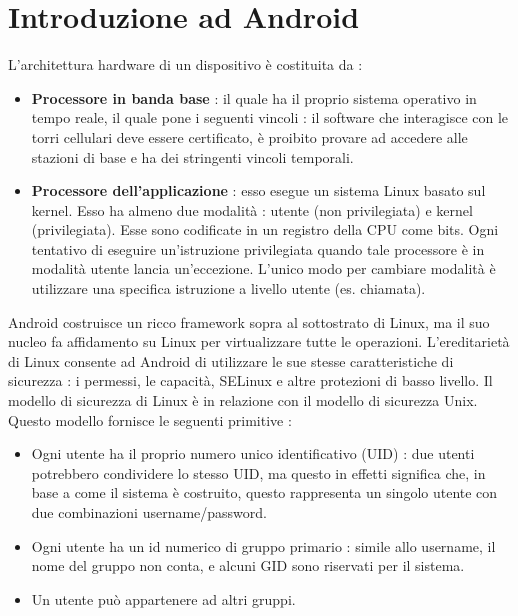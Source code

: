 \documentclass[12pt]{report}
\begin{document}
\chapter{Introduzione ad Android}
L'architettura hardware di un dispositivo è costituita da :
\begin{itemize}
\item \textbf{Processore in banda base} : il quale ha il proprio sistema operativo in tempo reale, il quale pone i seguenti vincoli : il software che interagisce con le torri cellulari deve essere certificato, è proibito provare ad accedere alle stazioni di base e ha dei stringenti vincoli temporali.
\item \textbf{Processore dell'applicazione} : esso esegue un sistema Linux basato sul kernel. Esso ha almeno due modalità : utente (non privilegiata) e kernel (privilegiata). Esse sono codificate in un registro della CPU come bits. Ogni tentativo di eseguire un'istruzione privilegiata quando tale processore è in modalità utente lancia un'eccezione. L'unico modo per cambiare modalità è utilizzare una specifica istruzione a livello utente (es. chiamata). 
\end{itemize}
Android costruisce un ricco framework sopra al sottostrato di Linux, ma il suo nucleo fa affidamento su Linux per virtualizzare tutte le operazioni. L'ereditarietà di Linux consente ad Android di utilizzare le sue stesse caratteristiche di sicurezza : i permessi, le capacità, SELinux e altre protezioni di basso livello. Il modello di sicurezza di Linux è in relazione con il modello di sicurezza Unix. Questo modello fornisce le seguenti primitive :
\begin{itemize}
\item Ogni utente ha il proprio numero unico identificativo (UID) : due utenti potrebbero condividere lo stesso UID, ma questo in effetti significa che, in base a come il sistema è costruito, questo rappresenta un singolo utente con due combinazioni username/password.
\item Ogni utente ha un id numerico di gruppo primario : simile allo username, il nome del gruppo non conta, e alcuni GID sono riservati per il sistema.
\item Un utente può appartenere ad altri gruppi.
\end{itemize}
\end{document}
